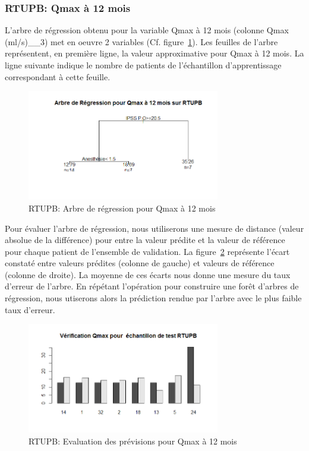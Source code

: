 \subsubsection{RTUPB: Qmax à 12 mois}

L'arbre de régression obtenu pour la variable Qmax à 12 mois (colonne Qmax (ml/s)__3) met en oeuvre 2 variables (Cf. figure~\ref{fig-rtupb-regtree-qmax12}). Les feuilles de l'arbre représentent, en première ligne, la valeur approximative pour Qmax à 12 mois. La ligne suivante indique le nombre de patients de l'échantillon d'apprentissage correspondant à cette feuille. 

\begin{figure}[H]
\centering
\includegraphics[width=0.75\textwidth]{../Fig/RTUPB/rtupb-regtree-qmax12.png}
\caption{RTUPB: Arbre de régression pour Qmax à 12 mois}
\label{fig-rtupb-regtree-qmax12}
\end{figure}

Pour évaluer l'arbre de régression, nous utiliserons une mesure de distance (valeur absolue de la différence) pour entre la valeur prédite et la valeur de référence pour chaque patient de l'ensemble de validation. 
La figure~\ref{fig-rtupb-regtree-test-qmax12} représente l'écart constaté entre valeurs prédites (colonne de gauche) et valeurs de référence (colonne de droite). La moyenne de ces écarts nous donne une mesure du taux d'erreur de l'arbre. En répétant l'opération pour construire une forêt d'arbres de régression, nous utiserons alors la prédiction rendue par l'arbre avec le plus faible taux d'erreur.

\begin{figure}[H]
\centering
\includegraphics[width=0.75\textwidth]{../Fig/RTUPB/rtupb-regtree-test-qmax12.png}
\caption{RTUPB: Evaluation des prévisions pour Qmax à 12 mois}
\label{fig-rtupb-regtree-test-qmax12}
\end{figure}

